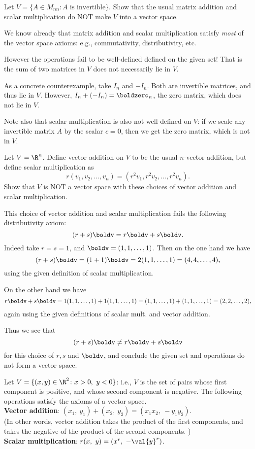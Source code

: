 \bb
\ii Let $V=\{A\in M_{nn}\colon A \text{ is invertible}\}$. Show that the usual matrix addition and scalar multiplication do NOT make $V$ into a vector space. 
\\
\begin{solution}
We know already that matrix addition and scalar multiplication satisfy {\em most} of the vector space axioms: e.g., commutativity, distributivity, etc. 

However the operations fail to be well-defined defined on the given set! That is the sum of two matrices in $V$ does not necessarily lie in $V$. 

As a concrete counterexample, take $I_n$ and $-I_n$. Both are invertible matrices, and thus lie in $V$. However, $I_n+(-I_n)=\boldzero_n$, the zero matrix, which does not lie in $V$. 

Note also that scalar multiplication is also not well-defined on $V$: if we scale any invertible matrix $A$ by the scalar $c=0$, then we get the zero matrix, which is not in $V$. 
\end{solution}
\ii Let $V=\R^n$. Define vector addition on $V$ to be the usual $n$-vector addition, but define scalar multiplication as 
\[
r(v_1,v_2,\dots ,v_n)=(r^2v_1,r^2v_2,\dots, r^2v_n). 
\]
Show that $V$ is NOT a vector space with these choices of vector addition and scalar multiplication.
\\
\begin{solution}
This choice of vector addition and scalar multiplication fails the following distributivity axiom:
\[
(r+s)\boldv=r\boldv+s\boldv.
\]
Indeed take $r=s=1$, and $\boldv=(1,1,\dots,1)$. Then on the one hand we have 
\[
(r+s)\boldv=(1+1)\boldv=2(1,1,\dots,1)=(4,4,\dots, 4), \]
using the given definition of scalar multiplication. 

On the other hand we have 
\[
r\boldv+s\boldv=1(1,1,\dots,1)+1(1,1,\dots,1)=(1,1,\dots,1)+(1,1,\dots,1)=(2,2,\dots,2),
\]
again using the given definitions of scalar mult. and vector addition. 

Thus we see that 
\[
(r+s)\boldv\ne r\boldv+s\boldv
\]
for this choice of $r,s$ and $\boldv$, and conclude the given set and operations do not form a vector space. 
\end{solution}
\ii Let $V=\{(x,y)\in\R^2\colon x>0, \ y<0\}$: i.e., $V$ is the set of pairs whose first component is positive, and whose second component is negative. The following operations satisfy the axioms of a vector space.  
\\
{\bf Vector addition}: $(x_1,\ y_1)+(x_2,\ y_2)=(x_1 x_2,\ -y_1 y_2)$. \\
(In other words, vector addition takes the product of the first components, and takes the negative of the product of the second components. )
\vspace{.1in}
\\
{\bf Scalar multiplication}: $r(x,\ y)=(x^r,\  -\val{y}^r)$.

